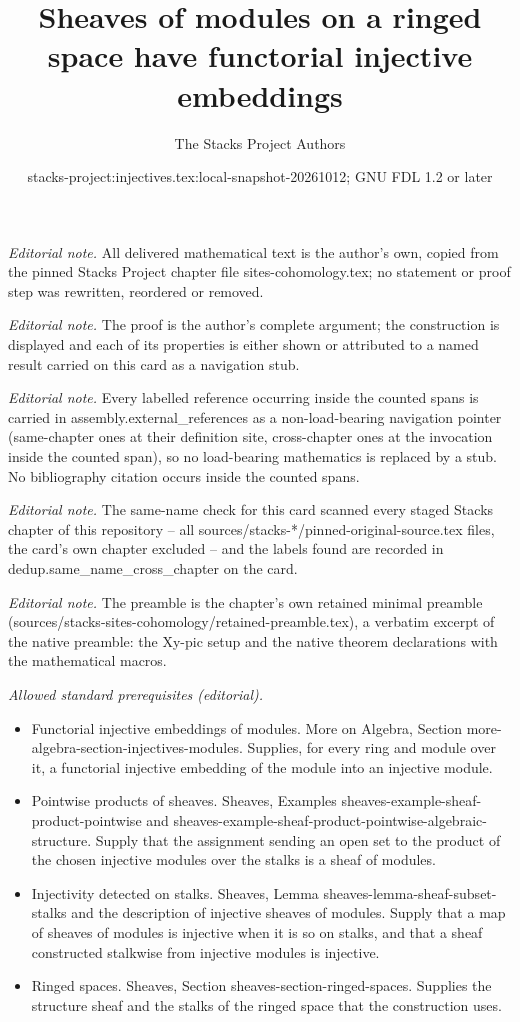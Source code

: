 \documentclass[10pt,a4paper]{amsart}
\title{Sheaves of modules on a ringed space have functorial injective embeddings}
\author{The Stacks Project Authors}
\date{stacks-project:injectives.tex:local-snapshot-20261012; GNU FDL 1.2 or later}
\theoremstyle{plain}
\theoremstyle{definition}
\theoremstyle{remark}
\numberwithin{equation}{subsection}
\begin{document}
\maketitle
\noindent\textit{Editorial note.} All delivered mathematical text is the author's own, copied from the pinned Stacks Project chapter file sites-cohomology.tex; no statement or proof step was rewritten, reordered or removed.\par\medskip
\noindent\textit{Editorial note.} The proof is the author's complete argument; the construction is displayed and each of its properties is either shown or attributed to a named result carried on this card as a navigation stub.\par\medskip
\noindent\textit{Editorial note.} Every labelled reference occurring inside the counted spans is carried in assembly.external\_references as a non-load-bearing navigation pointer (same-chapter ones at their definition site, cross-chapter ones at the invocation inside the counted span), so no load-bearing mathematics is replaced by a stub. No bibliography citation occurs inside the counted spans.\par\medskip
\noindent\textit{Editorial note.} The same-name check for this card scanned every staged Stacks chapter of this repository -- all sources/stacks-*/pinned-original-source.tex files, the card's own chapter excluded -- and the labels found are recorded in dedup.same\_name\_cross\_chapter on the card.\par\medskip
\noindent\textit{Editorial note.} The preamble is the chapter's own retained minimal preamble (sources/stacks-sites-cohomology/retained-preamble.tex), a verbatim excerpt of the native preamble: the Xy-pic setup and the native theorem declarations with the mathematical macros.\par\medskip
\noindent\textit{Allowed standard prerequisites (editorial).}\begin{itemize}
\item Functorial injective embeddings of modules. More on Algebra, Section more-algebra-section-injectives-modules. Supplies, for every ring and module over it, a functorial injective embedding of the module into an injective module.
\item Pointwise products of sheaves. Sheaves, Examples sheaves-example-sheaf-product-pointwise and sheaves-example-sheaf-product-pointwise-algebraic-structure. Supply that the assignment sending an open set to the product of the chosen injective modules over the stalks is a sheaf of modules.
\item Injectivity detected on stalks. Sheaves, Lemma sheaves-lemma-sheaf-subset-stalks and the description of injective sheaves of modules. Supply that a map of sheaves of modules is injective when it is so on stalks, and that a sheaf constructed stalkwise from injective modules is injective.
\item Ringed spaces. Sheaves, Section sheaves-section-ringed-spaces. Supplies the structure sheaf and the stalks of the ringed space that the construction uses.
\end{itemize}\medskip
\end{document}
